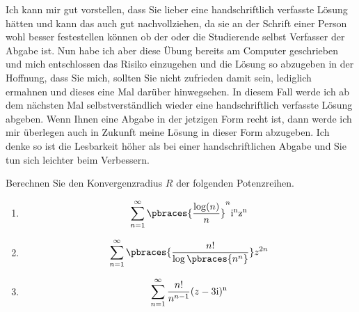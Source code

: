 Ich kann mir gut vorstellen, dass Sie lieber eine handschriftlich verfasste Lösung hätten und kann das auch gut nachvollziehen, da sie an der Schrift einer Person wohl besser festestellen können ob der oder die Studierende selbst Verfasser der Abgabe ist. Nun habe ich aber diese Übung bereits am Computer geschrieben und mich entschlossen das Risiko einzugehen und die Lösung so abzugeben in der Hoffnung, dass Sie mich, sollten Sie nicht zufrieden damit sein, lediglich ermahnen und dieses eine Mal darüber hinwegsehen. In diesem Fall werde ich ab dem nächsten Mal selbstverständlich wieder eine handschriftlich verfasste Lösung abgeben. Wenn Ihnen eine Abgabe in der jetzigen Form recht ist, dann werde ich mir überlegen auch in Zukunft meine Lösung in dieser Form abzugeben. Ich denke so ist die Lesbarkeit höher als bei einer handschriftlichen Abgabe und Sie tun sich leichter beim Verbessern. 
\begin{exercise}
    Berechnen Sie den Konvergenzradius $R$ der folgenden Potenzreihen. 
    \begin{enumerate}[label = \alph*)]
        \item 
        \begin{align*}
            \sum_{n = 1}^\infty \pbraces{\frac{\log(n)}{n}}^n \rm{i}^n z^n
        \end{align*}
        \item 
        \begin{align*}
            \sum_{n = 1}^\infty \pbraces{\frac{n!}{\log\pbraces{n^n}}} z^{2n}    
        \end{align*}
        \item 
        \begin{align*}
            \sum_{n = 1}^\infty \frac{n!}{n^{n-1}}(z - 3\rm{i})^n
        \end{align*}
    \end{enumerate}
\end{exercise}


